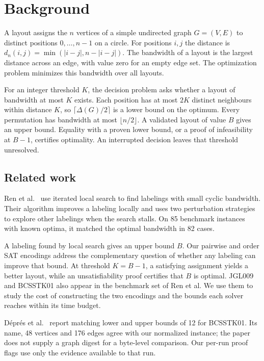 \section{Background}
A layout assigns the $n$ vertices of a simple undirected graph $G=(V,E)$
to distinct positions $0,\ldots,n-1$ on a circle. For positions $i,j$ the
distance is $d_n(i,j)=\min(|i-j|,n-|i-j|)$. The bandwidth of a layout
is the largest distance across an edge, with value zero for an empty edge
set. The optimization problem minimizes this bandwidth over all layouts.

For an integer threshold $K$, the decision problem asks whether a layout
of bandwidth at most $K$ exists. Each position has at most $2K$ distinct
neighbours within distance $K$, so $\lceil\Delta(G)/2\rceil$ is a lower
bound on the optimum. Every permutation has bandwidth at most
$\lfloor n/2\rfloor$. A validated layout of value $B$ gives an upper bound.
Equality with a proven lower bound, or a proof of infeasibility at $B-1$,
certifies optimality. An interrupted decision leaves that threshold unresolved.

\subsection{Related work}
Ren et al.~\cite{Ren2020CBMP} use iterated local search to find labelings
with small cyclic bandwidth. Their algorithm improves a labeling locally
and uses two perturbation strategies to explore other labelings when the
search stalls. On 85 benchmark instances with known optima, it matched
the optimal bandwidth in 82 cases.

A labeling found by local search gives an upper bound $B$. Our pairwise
and order SAT encodings address the complementary question of whether
any labeling can improve that bound. At threshold $K=B-1$, a satisfying
assignment yields a better layout, while an unsatisfiability proof
certifies that $B$ is optimal. JGL009 and BCSSTK01 also appear in the
benchmark set of Ren et al. We use them to study the cost of constructing
the two encodings and the bounds each solver reaches within its time budget.

D\'epr\'es et al.~\cite{Depres2021} report matching lower and upper
bounds of 12 for BCSSTK01. Its name, 48 vertices and 176 edges agree
with our normalized instance; the paper does not supply a graph digest
for a byte-level comparison. Our per-run proof flags use only the
evidence available to that run.
